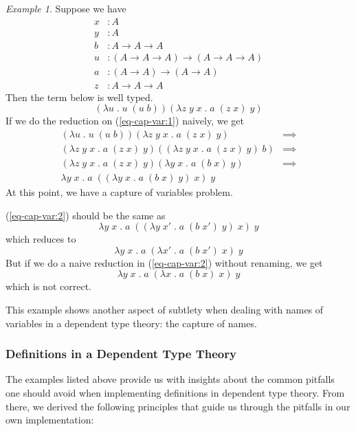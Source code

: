 \documentclass{article}
\theoremstyle{remark}
\newtheorem{example}{Example}
\begin{document}
\begin{example}\label{exa3}
  Suppose we have
  \begin{align*}
    x &: A \\
    y &: A \\
    b &: A \to A \to A \\
    u &: (A \to A \to A) \to (A \to A \to A) \\
    a &: (A \to A) \to (A \to A) \\
    z &: A \to A \to A
  \end{align*}
  Then the term below is well typed.
  \begin{equation} \label{eq-cap-var:1}
    (\lambda u \; . \; u \; (u \; b)) (\lambda z \; y \; x \; . \; a \; (z \; x) \; y)
  \end{equation}
  If we do the reduction on (\ref{eq-cap-var:1}) naively, we get
  \begin{align}
    (\lambda u \; . \; u \; (u \; b)) (\lambda z \; y \; x \; . \; a \; (z \; x) \; y) & \implies \nonumber \\
    (\lambda z \; y \; x \; . \; a \; (z \; x) \; y) ((\lambda z \; y \; x \; . \; a \; (z \; x) \; y) \; b) & \implies \nonumber \\
    (\lambda z \; y \; x \; . \; a \; (z \; x) \; y) (\lambda y \; x \; . \; a \; (b \; x) \; y) & \implies \nonumber \\
    \lambda y \; x \; . \; a \; ((\lambda y \; x \; . \; a \; (b \; x) \; y)\; x) \; y \label{eq-cap-var:2}
  \end{align}
  At this point, we have a capture of variables problem.

  (\ref{eq-cap-var:2}) should be the same as
  \[ \lambda y \; x \; . \; a \; ((\lambda y \; x' \; . \; a \; (b \; x') \; y)\; x) \; y \]
  which reduces to
  \[ \lambda y \; x \; . \; a \; (\lambda x' \; . \; a \; (b \; x') \; x) \; y \]
  But if we do a naive reduction in (\ref{eq-cap-var:2}) without renaming, we get 
  \[ \lambda y \; x \; . \; a \; (\lambda x \; . \; a \; (b \; x) \; x) \; y \]
  which is not correct.

  This example shows another aspect of subtlety when dealing with names of variables in a dependent type theory: the capture of names.
\end{example}

\subsubsection{Definitions in a Dependent Type Theory} \label{sec:theory:definition}
The examples listed above provide us with insights about the common pitfalls one should avoid when implementing definitions in dependent type theory. From there, we derived the following principles that guide us through the pitfalls in our own implementation:
\end{document}
